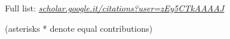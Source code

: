 


Full list: 
\emph{\href{https://scholar.google.it/citations?user=zEy5CTkAAAAJ\&hl=en}{scholar.google.it/citations?user=zEy5CTkAAAAJ}}
\\\begin{footnotesize}(asterisks * denote equal contributions)\end{footnotesize}

